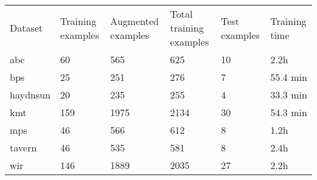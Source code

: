 \begin{tabular}{llllll}
Dataset        & Training examples & Augmented examples & Total training examples & Test examples & Training time \\
\gls{abc}      & 60                & 565                & 625                     & 10            & 2.2h          \\
\gls{bps}      & 25                & 251                & 276                     & 7             & 55.4 min      \\
\gls{haydnsun} & 20                & 235                & 255                     & 4             & 33.3 min      \\
\gls{kmt}      & 159               & 1975               & 2134                    & 30            & 54.3 min      \\
\gls{mps}      & 46                & 566                & 612                     & 8             & 1.2h          \\
\gls{tavern}   & 46                & 535                & 581                     & 8             & 2.4h          \\
\gls{wir}      & 146               & 1889               & 2035                    & 27            & 2.2h         
\end{tabular}
